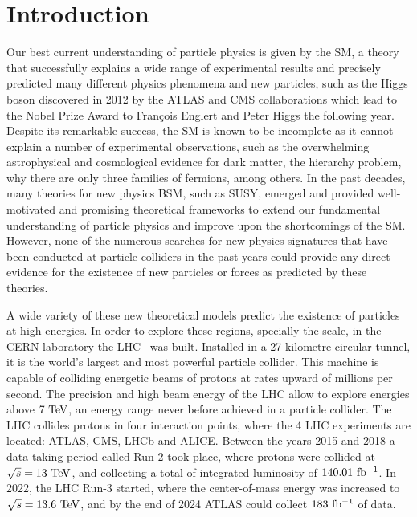 \chapter*{Introduction}



Our best current understanding of particle physics is given by the \ac{SM}, a theory that successfully explains a wide range of experimental results and precisely predicted many different physics phenomena and new particles, such as the Higgs boson discovered in 2012 by the \acs{ATLAS} and \ac{CMS} collaborations which lead to the Nobel Prize Award to François Englert and Peter Higgs the following year. Despite its remarkable success, the \ac{SM} is known to be incomplete as it cannot explain a number of experimental observations, such as the overwhelming astrophysical and cosmological evidence for dark matter, the hierarchy problem, why there are only three families of fermions, among others. In the past decades, many theories for new physics \ac{BSM}, such as \ac{SUSY}, emerged and provided well-motivated and promising theoretical frameworks to extend our fundamental understanding of particle physics and improve upon the shortcomings of the \ac{SM}. However, none of the numerous searches for new physics signatures that have been conducted at particle colliders in the past years could provide any direct evidence for the existence of new particles or forces as predicted by these theories.

A wide variety of these new theoretical models predict the existence of particles at high energies. In order to explore these regions, specially the \tev scale, in the \ac{CERN} laboratory the \ac{LHC}~\cite{LHC-Machine} was built. Installed in a 27-kilometre circular tunnel, it is the world's largest and most powerful particle collider. This machine is capable of colliding energetic beams of protons at rates upward of millions per second. The precision and high beam energy of the \ac{LHC} allow to explore energies above \(7~\tev\), an energy range never before achieved in a particle collider. The \ac{LHC} collides protons in four interaction points, where the 4 \ac{LHC} experiments are located: \ac{ATLAS}, \ac{CMS}, \ac{LHCb} and \ac{ALICE}.
Between the years 2015 and 2018 a data-taking period called Run-2 took place, where protons were collided at \(\sqs=13~\tev\), and collecting a total of integrated luminosity of \(140.01~\ifb\). In 2022, the \ac{LHC} Run-3 started, where the center-of-mass energy was increased to \(\sqs=13.6~\tev\), and by the end of 2024 \ac{ATLAS} could collect \(183~\ifb\) of data.

